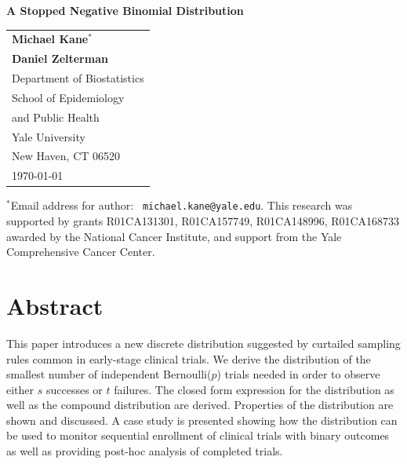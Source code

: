 \documentclass[12pt]{article}         %
\begin{document}
\thispagestyle{empty}
\begin{center}
\vspace*{\fill}

{\Large\bf A Stopped Negative Binomial Distribution} \\ [1ex]

\vspace*{1.25in}
\begin{tabular}{l} 
 {\bf Michael Kane${}^*$} \\
 {\bf Daniel Zelterman}  \\[.1in]

 Department of Biostatistics \\
 School of Epidemiology  \\
 \hspace*{.15in} and Public Health  \\
 Yale University       \\
 New Haven, CT  06520  \\[.2in]

\today
\end{tabular}
\end{center}

\vspace*{\fill}

\noindent${}^*$Email address for author: {\tt
michael.kane@yale.edu}.  This research was supported by grants 
	R01CA131301, R01CA157749, R01CA148996, R01CA168733 awarded by the National Cancer Institute, and support from the Yale Comprehensive Cancer Center.







\newpage
\thispagestyle{empty}

\section*    {\bf   Abstract}

This paper introduces a new discrete distribution suggested by curtailed sampling rules common in early-stage clinical trials. We derive the distribution of the smallest number of independent Bernoulli($p$) trials needed in order to observe either $s$ successes or $t$ failures. The closed form expression for the distribution as well as the compound distribution are derived. Properties of the distribution are shown and discussed. A case study is presented showing how the distribution can be used to monitor sequential enrollment of clinical trials with binary outcomes as well as providing post-hoc analysis of completed trials.
\end{document}
